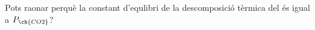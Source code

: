 \begin{exr}
Pots raonar perquè la constant d'equlibri de la descomposició tèrmica del  és igual a $P_{\ch{CO2}}$?
\end{exr}